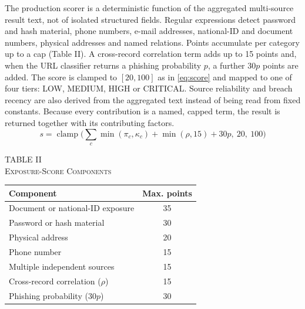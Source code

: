 \documentclass[10pt,twocolumn]{article}
\newcommand{\tcap}[2]{\begin{center}\footnotesize TABLE #1\\[1pt]\scshape #2\end{center}\vspace{-8pt}}
\newcommand{\tnote}[1]{\par\vspace{2pt}{\footnotesize #1\par}}
\begin{document}
The production scorer is a deterministic function of the aggregated multi-source result text, not of isolated structured fields. Regular expressions detect password and hash material, phone numbers, e-mail addresses, national-ID and document numbers, physical addresses and named relations. Points accumulate per category up to a cap (Table II). A cross-record correlation term adds up to 15 points and, when the URL classifier returns a phishing probability $p$, a further $30p$ points are added. The score is clamped to $[20,100]$ as in \eqref{eq:score} and mapped to one of four tiers: LOW, MEDIUM, HIGH or CRITICAL. Source reliability and breach recency are also derived from the aggregated text instead of being read from fixed constants. Because every contribution is a named, capped term, the result is returned together with its contributing factors.
\begin{equation}
s=\operatorname{clamp}\!\Big(\sum_{c}\min(\pi_c,\kappa_c)+\min(\rho,15)+30p,\ 20,\ 100\Big)
\label{eq:score}
\end{equation}

\begin{table}[!t]
\centering
\tcap{II}{Exposure-Score Components}
\footnotesize
\begin{tabular}{|l|c|}
\hline
\textbf{Component} & \textbf{Max. points}\\
\hline
Document or national-ID exposure & 35\\
\hline
Password or hash material & 30\\
\hline
Physical address & 20\\
\hline
Phone number & 15\\
\hline
Multiple independent sources & 15\\
\hline
Cross-record correlation ($\rho$) & 15\\
\hline
Phishing probability ($30p$) & 30\\
\hline
\end{tabular}
\tnote{The caps sum to 160, and the score is clamped to $[20,100]$. Here $\pi_c$ is the number of points earned in category $c$ and $\kappa_c$ is its cap.}
\end{table}
\end{document}
